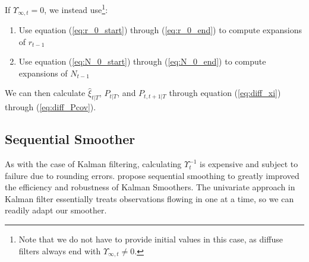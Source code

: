 \documentclass[10pt]{article}
\newenvironment{boenumerate}
    {\begin{enumerate}\renewcommand\labelenumi{\textbf\theenumi}}
    {\end{enumerate}}
\numberwithin{equation}{section}
\begin{document}
If $\Upsilon_{\infty,t}=0$, we instead use\footnote{Note that we do not have to provide initial values in this case, as diffuse filters always end with $\Upsilon_{\infty,t}\neq 0$.}:
\begin{boenumerate}
    \item Use equation (\ref{eq:r_0_start}) through (\ref{eq:r_0_end}) to compute expansions of $r_{t-1}$
    \item Use equation (\ref{eq:N_0_start}) through (\ref{eq:N_0_end}) to compute expansions of $N_{t-1}$
\end{boenumerate}

We can then calculate $\hat{\xi}_{t|T}$, $P_{t|T}$, and $P_{t,t+1|T}$ through equation (\ref{eq:diff_xi}) through (\ref{eq:diff_Pcov}). 

\subsection{Sequential Smoother}
As with the case of Kalman filtering, calculating $\Upsilon_t^{-1}$ is expensive and subject to failure due to rounding errors. \cite{durbin_koopman_2000} propose sequential smoothing to greatly improved the efficiency and robustness of Kalman Smoothers. The univariate approach in Kalman filter essentially treats observations flowing in one at a time, so we can readily adapt our smoother.
\end{document}
